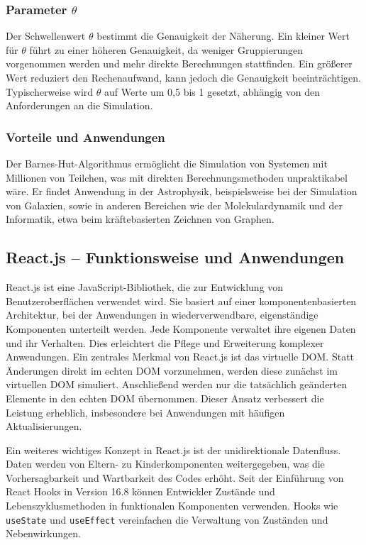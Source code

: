 \documentclass[a4paper,12pt,twoside]{article}
\begin{document}
\subsubsection{Parameter $\theta$}
Der Schwellenwert $\theta$ bestimmt die Genauigkeit der Näherung. Ein kleiner Wert für $\theta$ führt zu einer höheren Genauigkeit, da weniger Gruppierungen vorgenommen werden und mehr direkte Berechnungen stattfinden. Ein größerer Wert reduziert den Rechenaufwand, kann jedoch die Genauigkeit beeinträchtigen. Typischerweise wird $\theta$ auf Werte um 0,5 bis 1 gesetzt, abhängig von den Anforderungen an die Simulation.

\subsubsection{Vorteile und Anwendungen}
Der Barnes-Hut-Algorithmus ermöglicht die Simulation von Systemen mit Millionen von Teilchen, was mit direkten Berechnungsmethoden unpraktikabel wäre. Er findet Anwendung in der Astrophysik, beispielsweise bei der Simulation von Galaxien, sowie in anderen Bereichen wie der Molekulardynamik und der Informatik, etwa beim kräftebasierten Zeichnen von Graphen.

\subsection{React.js -- Funktionsweise und Anwendungen}

React.js ist eine JavaScript-Bibliothek, die zur Entwicklung von Benutzeroberflächen verwendet wird. Sie basiert auf einer komponentenbasierten Architektur, bei der Anwendungen in wiederverwendbare, eigenständige Komponenten unterteilt werden. Jede Komponente verwaltet ihre eigenen Daten und ihr Verhalten. Dies erleichtert die Pflege und Erweiterung komplexer Anwendungen. Ein zentrales Merkmal von React.js ist das virtuelle DOM. Statt Änderungen direkt im echten DOM vorzunehmen, werden diese zunächst im virtuellen DOM simuliert. Anschließend werden nur die tatsächlich geänderten Elemente in den echten DOM übernommen. Dieser Ansatz verbessert die Leistung erheblich, insbesondere bei Anwendungen mit häufigen Aktualisierungen.

Ein weiteres wichtiges Konzept in React.js ist der unidirektionale Datenfluss. Daten werden von Eltern- zu Kinderkomponenten weitergegeben, was die Vorhersagbarkeit und Wartbarkeit des Codes erhöht. Seit der Einführung von React Hooks in Version 16.8 können Entwickler Zustände und Lebenszyklusmethoden in funktionalen Komponenten verwenden. Hooks wie \texttt{useState} und \texttt{useEffect} vereinfachen die Verwaltung von Zuständen und Nebenwirkungen.
\end{document}
